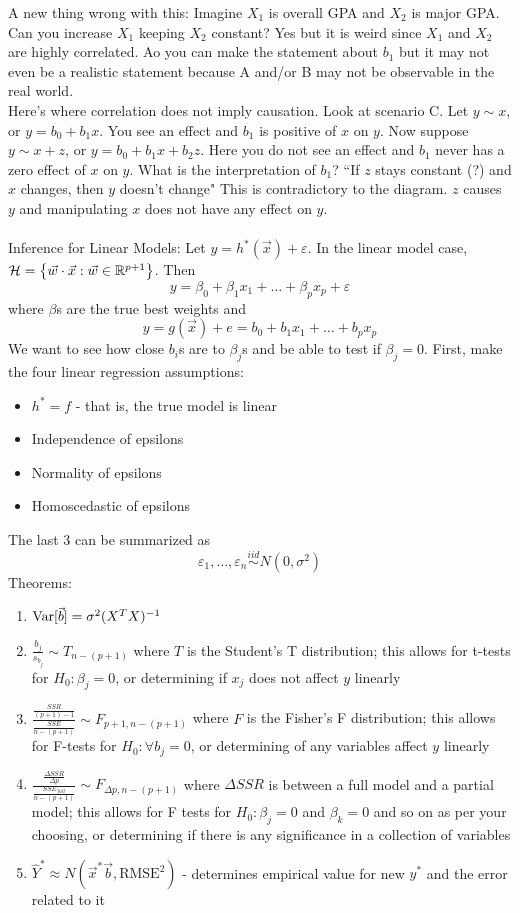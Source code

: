 \documentclass[12pt]{article}
\begin{document}
A new thing wrong with this: Imagine $X_1$ is overall GPA and $X_2$ is major GPA. Can you increase $X_1$ keeping $X_2$ constant? Yes but it is weird since $X_1$ and $X_2$ are highly correlated. Ao you can make the statement about $b_1$ but it may not even be a realistic statement because A and/or B may not be observable in the real world. \\
Here's where correlation does not imply causation. Look at scenario C. Let $ y \sim x$, or $y = b_0 + b_1x$. You see an effect and $b_1$ is positive of $x$ on $y$. Now suppose $y \sim x + z$, or $y = b_0 + b_1x + b_2z$. Here you do not see an effect and $b_1$ never has a zero effect of $x$ on $y$. What is the interpretation of $b_1$? ``If $z$ stays constant (?) and $x$ changes, then $y$ doesn't change" This is contradictory to the diagram. $z$ causes $y$ and manipulating $x$ does not have any effect on $y$. \\~\\

Inference for Linear Models: Let $y = h^*(\vec{x}) + \varepsilon$. In the linear model case, $\mathcal{H} = \left\{ \vec{w} \cdot \vec{x}: \vec{w} \in \mathbb{R}^{p+1} \right\}$. Then $$y = \beta_0 + \beta_1x_1 + \dots + \beta_px_p + \varepsilon $$ where $\beta$s are the true best weights and $$y = g(\vec{x}) + e = b_0 + b_1x_1 + \dots + b_px_p$$ We want to see how close $b_i$s are to $\beta_j$s and be able to test if $\beta_j = 0$. First, make the four linear regression assumptions: \begin{itemize} 
\item $h^* = f$ - that is, the true model is linear 
\item Independence of epsilons 
\item Normality of epsilons 
\item Homoscedastic of epsilons \end{itemize}
The last $3$ can be summarized as $$ \varepsilon_1,\dots,\varepsilon_n \stackrel{iid}{\sim} N(0, \sigma^2) $$ 
Theorems: \begin{enumerate} 
\item $\mathrm{Var}[ \vec{b} ] = \sigma^2(X^TX)^{-1}$ 
\item $\frac{b_j}{s_{b_j}} \sim T_{n - (p+1)} $ where $T$ is the Student's T distribution; this allows for t-tests for $H_0: \beta_j = 0$, or determining if $x_j$ does not affect $y$ linearly
\item $\frac{ \frac{SSR}{(p+1)-1}}{\frac{SSE}{n-(p+1)}} \sim F_{p+1, n-(p+1)}$ where $F$ is the Fisher's F distribution; this allows for F-tests for $H_0: \forall b_j = 0$, or determining of any variables affect $y$ linearly
\item $\frac{\frac{\Delta SSR}{\Delta p}}{\frac{SSE_{full}}{n - (p+1)}} \sim F_{\Delta p, n - (p+1)}$ where $\Delta SSR$ is between a full model and a partial model; this allows for F tests for $H_0: \beta_j = 0$ and $\beta_k = 0$ and so on as per your choosing, or determining if there is any significance in a collection of variables 
\item $\hat{Y}^* \approx N(\vec{x}^*\vec{b}, \text{RMSE}^2)$ - determines empirical value for new $y^*$ and the error related to it \end{enumerate} 
\end{document}
